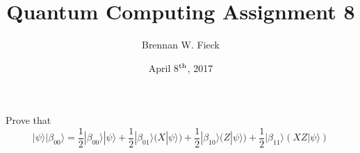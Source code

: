 \documentclass[12pt]{article}
\newenvironment{problem}[2][Problem]{\begin{trivlist}
\item[\hskip \labelsep {\bfseries #1}\hskip \labelsep {\bfseries #2.}]}{\end{trivlist}}
\begin{document}
 
 
\title{Quantum Computing Assignment 8}
\author{Brennan W. Fieck}
\date{April 8$^\textnormal{th}$, 2017}
\maketitle

\begin{problem}{5.2.1}
Prove that\\
\begin{equation}
\tag{5.2.8}
|\psi\rangle|\beta_{00}\rangle=\frac{1}{2}|\beta_{00}\rangle|\psi\rangle+\frac{1}{2}|\beta_{01}\rangle(X|\psi\rangle)+\frac{1}{2}|\beta_{10}\rangle(Z|\psi\rangle)+\frac{1}{2}|\beta_{11}\rangle(XZ|\psi\rangle)
\end{equation}
\end{problem}
\end{document}
